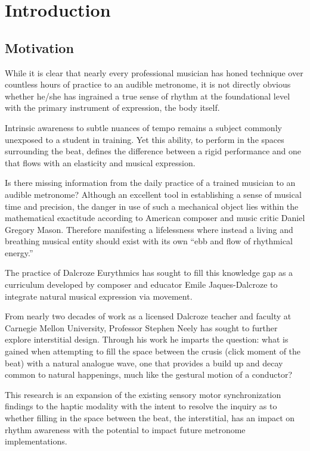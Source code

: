 
\chapter{Introduction} \label{secIntro}
\section{Motivation}
While it is clear that nearly every professional musician has honed technique over countless hours of practice to an audible metronome, it is not directly obvious whether he/she has ingrained a true sense of rhythm at the foundational level with the primary instrument of expression, the body itself.

Intrinsic awareness to subtle nuances of tempo remains a subject commonly unexposed to a student in training. Yet this ability, to perform in the spaces surrounding the beat, defines the difference between a rigid performance and one that flows with an elasticity and musical expression.

Is there missing information from the daily practice of a trained musician to an audible metronome? Although an excellent tool in establishing a sense of musical time and precision, the danger in use of such a mechanical object lies within the mathematical exactitude according to American composer and music critic Daniel Gregory Mason. Therefore manifesting a lifelessness where instead a living and breathing musical entity should exist with its own ``ebb and flow of rhythmical energy.''\cite{fitts2008new}

The practice of Dalcroze Eurythmics has sought to fill this knowledge gap as a curriculum developed by composer and educator Emile Jaques-Dalcroze to integrate natural musical expression via movement.  

From nearly two decades of work as a licensed Dalcroze teacher and faculty at Carnegie Mellon University, Professor Stephen Neely has sought to further explore interstitial design. Through his work he imparts the question: what is gained when attempting to fill the space between the crusis (click moment of the beat) with a natural analogue wave, one that provides a build up and decay common to natural happenings, much like the gestural motion of a conductor?

This research is an expansion of the existing sensory motor synchronization findings to the haptic modality with the intent to resolve the inquiry as to whether filling in the space between the beat, the interstitial, has an impact on rhythm awareness with the potential to impact future metronome implementations. 


